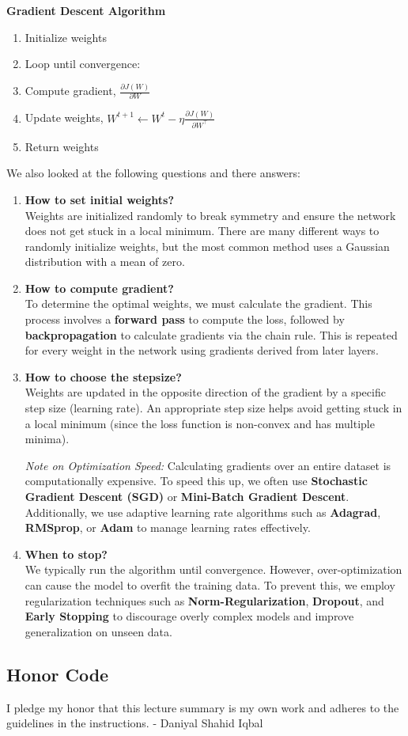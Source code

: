 \documentclass{article}
\begin{document}
\textbf{Gradient Descent Algorithm}
\begin{enumerate}
    \item Initialize weights
    \item Loop until convergence:
    \item Compute gradient, $\frac{\partial J(W)}{\partial W}$
    \item Update weights, $W^{t+1} \leftarrow W^{t} - \eta \frac{\partial J(W)}{\partial W^\top}$
    \item Return weights
\end{enumerate}

We also looked at the following questions and there answers:
\begin{enumerate}
    \item \textbf{How to set initial weights?} \\
    Weights are initialized randomly to break symmetry and ensure the network does not get stuck in a local minimum. There are many different ways to randomly initialize weights, but the most common method uses a Gaussian distribution with a mean of zero.

    \item \textbf{How to compute gradient?} \\
    To determine the optimal weights, we must calculate the gradient. This process involves a \textbf{forward pass} to compute the loss, followed by \textbf{backpropagation} to calculate gradients via the chain rule. This is repeated for every weight in the network using gradients derived from later layers.

    \item \textbf{How to choose the stepsize?} \\
    Weights are updated in the opposite direction of the gradient by a specific step size (learning rate). An appropriate step size helps avoid getting stuck in a local minimum (since the loss function is non-convex and has multiple minima).
    
    \textit{Note on Optimization Speed:} Calculating gradients over an entire dataset is computationally expensive. To speed this up, we often use \textbf{Stochastic Gradient Descent (SGD)} or \textbf{Mini-Batch Gradient Descent}. Additionally, we use adaptive learning rate algorithms such as \textbf{Adagrad}, \textbf{RMSprop}, or \textbf{Adam} to manage learning rates effectively.

    \item \textbf{When to stop?} \\
    We typically run the algorithm until convergence. However, over-optimization can cause the model to overfit the training data. To prevent this, we employ regularization techniques such as \textbf{Norm-Regularization}, \textbf{Dropout}, and \textbf{Early Stopping} to discourage overly complex models and improve generalization on unseen data.
\end{enumerate}

\subsection*{Honor Code}
I pledge my honor that this lecture summary is my own work and adheres to the guidelines in the instructions.
- Daniyal Shahid Iqbal
\end{document}
